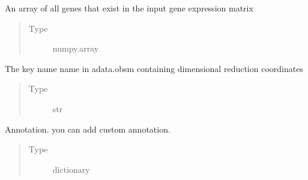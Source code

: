 \documentclass[letterpaper,10pt,english]{sphinxmanual}
\begin{document}
\begin{fulllineitems}
\begin{fulllineitems}
\end{fulllineitems}


\begin{fulllineitems}
\label{\detokenize{modules/celloracle:celloracle.Net.all_genes}}
An array of all genes that exist in the input gene expression matrix
\begin{quote}\begin{description}
\item[{Type}] \leavevmode
numpy.array

\end{description}\end{quote}

\end{fulllineitems}


\begin{fulllineitems}
\label{\detokenize{modules/celloracle:celloracle.Net.embedding_name}}
The key name name in adata.obsm containing dimensional reduction coordinates
\begin{quote}\begin{description}
\item[{Type}] \leavevmode
str

\end{description}\end{quote}

\end{fulllineitems}


\begin{fulllineitems}
\label{\detokenize{modules/celloracle:celloracle.Net.annotation}}
Annotation. you can add custom annotation.
\begin{quote}\begin{description}
\item[{Type}] \leavevmode
dictionary

\end{description}\end{quote}


\end{fulllineitems}
\end{fulllineitems}
\end{document}

